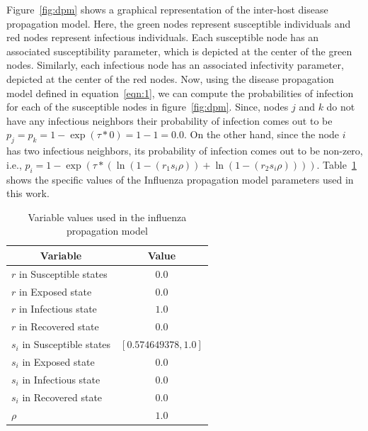 \documentclass[doublespace,draft]{VTthesis}
\begin{document}
    Figure~\ref{fig:dpm} shows a graphical representation of the inter-host disease propagation model. Here, the green nodes represent susceptible individuals and red nodes represent infectious individuals. Each susceptible node has an associated susceptibility parameter, which is depicted at the center of the green nodes. Similarly, each infectious node has an associated infectivity parameter, depicted at the center of the red nodes. Now, using the disease propagation model defined in equation~\ref{eqn:1}, we can compute the probabilities of infection for each of the susceptible nodes in figure~\ref{fig:dpm}. Since, nodes $j$ and $k$ do not have any infectious neighbors their probability of infection comes out to be $p_j = p_k = 1 - \exp (\tau * 0 ) = 1 - 1 = 0.0$. On the other hand, since the node $i$ has two infectious neighbors, its probability of infection comes out to be non-zero, i.e., $p_i = 1 - \exp (\tau * (\ln (1 - (r_1 s_i \rho)) + \ln (1 - (r_2 s_i \rho))))$. Table~\ref{table:1} shows the specific values of the Influenza propagation model parameters used in this work. 
    \begin{table}[!t]
    \renewcommand{\arraystretch}{1.3}
    \centering
    \caption{Variable values used in the influenza propagation model}
    \begin{tabular}{|l|c|}
    \hline
    \multicolumn{1}{|c|}{\textbf{Variable}} & \textbf{Value}  \\ \hline
    $r$ in Susceptible states & $0.0$ \\ \hline
    $r$ in Exposed state & $0.0$ \\ \hline
    $r$ in Infectious state & $1.0$ \\ \hline
    $r$ in Recovered state & $0.0$ \\ \hline
    $s_i$ in Susceptible states & $[0.574649378, 1.0]$ \\ \hline
    $s_i$ in Exposed state & $0.0$ \\ \hline 
    $s_i$ in Infectious state & $0.0$ \\ \hline
    $s_i$ in Recovered state & $0.0$ \\ \hline
    $\rho$ & $1.0$ \\ \hline
    \end{tabular}
    \label{table:1}
    \end{table}
    
\end{document}
